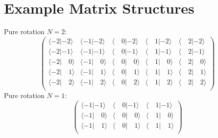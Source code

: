 \documentclass{article}
\begin{document}
\section{Example Matrix Structures}
Pure rotation $N=2$:
\begin{equation*}
\begin{pmatrix}
\langle-2|-2\rangle & \langle-1|-2\rangle & \langle\quad0|-2\rangle & \langle\quad1|-2\rangle & \langle\quad2|-2\rangle \\
\langle-2|-1\rangle & \langle-1|-1\rangle & \langle\quad0|-1\rangle & \langle\quad1|-1\rangle & \langle\quad2|-1\rangle \\
\langle-2|\quad0\rangle & \langle-1|\quad0\rangle & \langle\quad0|\quad0\rangle & \langle\quad1|\quad0\rangle & \langle\quad2|\quad0\rangle \\
\langle-2|\quad1\rangle & \langle-1|\quad1\rangle & \langle\quad0|\quad1\rangle & \langle\quad1|\quad1\rangle & \langle\quad2|\quad1\rangle \\
\langle-2|\quad2\rangle & \langle-1|\quad2\rangle & \langle\quad0|\quad2\rangle & \langle\quad1|\quad2\rangle & \langle\quad2|\quad2\rangle \\
\end{pmatrix}
\end{equation*}
Pure rotation $N=1$:
\begin{equation*}
\begin{pmatrix}
\langle-1|-1\rangle & \langle\quad0|-1\rangle & \langle\quad1|-1\rangle \\
\langle-1|\quad0\rangle & \langle\quad0|\quad0\rangle & \langle\quad1|\quad0\rangle \\
\langle-1|\quad1\rangle & \langle\quad0|\quad1\rangle & \langle\quad1|\quad1\rangle \\
\end{pmatrix}
\end{equation*}
\end{document}
